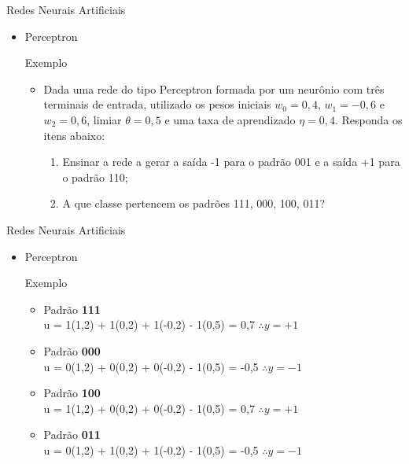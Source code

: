 \documentclass{libs/ufc_format}
\begin{document}
\begin{frame}{Redes Neurais Artificiais}
    \begin{itemize}
        \item Perceptron\\
        \begin{exampleblock}{Exemplo}
            \begin{itemize}
                \justifying
                \item Dada uma rede do tipo Perceptron formada por um neurônio com três terminais de entrada, utilizado os pesos iniciais $w_{0} = 0,4$, $w_{1} = -0,6$ e $w_{2} = 0,6$, limiar $\theta = 0,5$ e uma taxa de aprendizado $\eta = 0,4$. Responda os itens abaixo:
                    \begin{enumerate}
                        \justifying
                        \item Ensinar a rede a gerar a saída -1 para o padrão 001 e a saída +1 para o padrão 110;
                        \item \alert{A que classe pertencem os padrões 111, 000, 100, 011?}
                    \end{enumerate}
            \end{itemize}
        \end{exampleblock}
    \end{itemize}
\end{frame}

\begin{frame}{Redes Neurais Artificiais}
    \begin{itemize}
        \item Perceptron\\
        \begin{exampleblock}{Exemplo}
            \begin{itemize}
                \justifying
                \item Padrão \textbf{111}\\
                u = 1(1,2) + 1(0,2) + 1(-0,2) - 1(0,5) = 0,7 $\therefore y = +1$
                \item<2-> Padrão \textbf{000}\\
                u = 0(1,2) + 0(0,2) + 0(-0,2) - 1(0,5) = -0,5 $\therefore y = -1$
                \item<3-> Padrão \textbf{100}\\
                u = 1(1,2) + 0(0,2) + 0(-0,2) - 1(0,5) = 0,7 $\therefore y = +1$
                \item<4-> Padrão \textbf{011}\\
                u = 0(1,2) + 1(0,2) + 1(-0,2) - 1(0,5) = -0,5 $\therefore y = -1$
            \end{itemize}
        \end{exampleblock}
    \end{itemize}
\end{frame}
\end{document}
